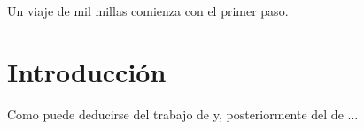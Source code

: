 



\begin{savequote}[50mm]
Un viaje de mil millas comienza
con el primer paso.
\end{savequote}

\chapter{Introducción}
\label{cha:introduccion}
\ifpdf
    \graphicspath{{1_introduction/figures/PNG/}{1_introduction/figures/PDF/}{1_introduction/figures/}}
\else
    \graphicspath{{1_introduction/figures/EPS/}{1_introduction/figures/}}
\fi


Como puede deducirse del trabajo de \cite{Bailey} y, posteriormente del de
\cite{Ta}... 


